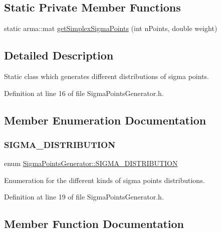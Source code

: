 \subsection*{Static Private Member Functions}
\begin{DoxyCompactItemize}
\item 
static arma\+::mat \mbox{\hyperlink{classSigmaPointsGenerator_a5cfc30f689336a2a736e8c02fdaccfd2}{get\+Simplex\+Sigma\+Points}} (int n\+Points, double weight)
\end{DoxyCompactItemize}


\subsection{Detailed Description}
Static class which generates different distributions of sigma points. 

Definition at line 16 of file Sigma\+Points\+Generator.\+h.



\subsection{Member Enumeration Documentation}
\mbox{\label{classSigmaPointsGenerator_ad6f9474c0313425a10add120e0acf944}} 
\subsubsection{\texorpdfstring{S\+I\+G\+M\+A\+\_\+\+D\+I\+S\+T\+R\+I\+B\+U\+T\+I\+ON}{SIGMA\_DISTRIBUTION}}
{\footnotesize\ttfamily enum \mbox{\hyperlink{classSigmaPointsGenerator_ad6f9474c0313425a10add120e0acf944}{Sigma\+Points\+Generator\+::\+S\+I\+G\+M\+A\+\_\+\+D\+I\+S\+T\+R\+I\+B\+U\+T\+I\+ON}}}

Enumeration for the different kinds of sigma points distributions. 

Definition at line 19 of file Sigma\+Points\+Generator.\+h.



\subsection{Member Function Documentation}
\mbox{\label{classSigmaPointsGenerator_a9c6bab6d0253b217488a04d65853e585}} 

